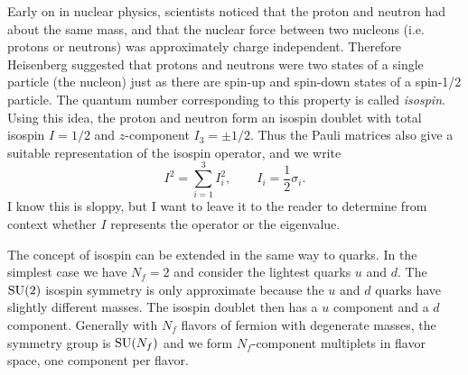 Early on in nuclear physics, scientists noticed that the proton and neutron had
about the same mass, and that the nuclear force between two nucleons (i.e.
protons or neutrons) was approximately charge independent. Therefore Heisenberg
suggested that protons and neutrons were two states of a single particle (the
nucleon) just as there are spin-up and spin-down states of a spin-1/2
particle.
The quantum number corresponding to this property is called {\it isospin}.
Using this idea, the proton and neutron form an isospin doublet with total
isospin $I=1/2$ and $z$-component $I_3=\pm1/2$. Thus the Pauli matrices also
give a suitable representation of the isospin operator, and we write
\begin{equation}
  I^2=\sum\limits_{i=1}^3 I_i^2, \qquad I_i=\frac{1}{2}\sigma_i.
\end{equation}
I know this is sloppy, but I want to leave it to the reader to determine from
context whether $I$ represents the operator or the eigenvalue. 

The concept of isospin can be extended in the same way to quarks. 
In the simplest case we have $N_f=2$ and consider the lightest quarks
$u$ and $d$. The $\operatorname{SU}(2)$ isospin symmetry is only approximate because 
the $u$ and $d$ quarks have slightly different masses. The isospin 
doublet then has a $u$ component and a $d$ component. Generally with
$N_f$ flavors of fermion with degenerate masses, the symmetry group is 
$\operatorname{SU}(N_f)$ and we
form $N_f$-component multiplets in flavor space, one component per flavor.

